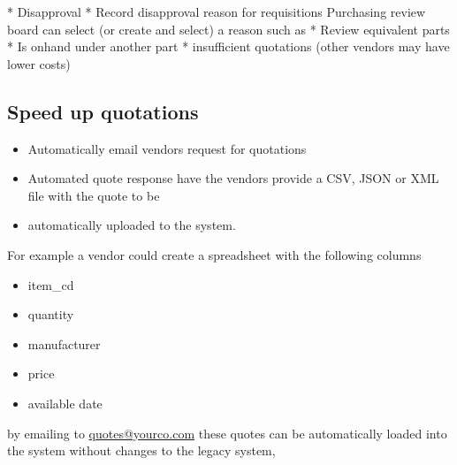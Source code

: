 \documentclass[letterpaper,10pt,english]{sphinxmanual}
\begin{document}
* Disapproval
\textbar{}  * Record disapproval reason for requisitions Purchasing review board
can select (or create and select) a reason such as
\textbar{}  * Review equivalent parts * Is onhand under another part *
insufficient quotations (other vendors may have lower costs)


\subsection{Speed up quotations}
\label{BusinessProcessReengineering:speed-up-quotations}\begin{itemize}
\item {} 
Automatically email vendors request for quotations

\item {} 
Automated quote response have the vendors provide a CSV, JSON or XML
file with the quote to be

\item {} 
automatically uploaded to the system.

\end{itemize}

For example a vendor could create a spreadsheet with the following
columns
\begin{itemize}
\item {} 
item\_cd

\item {} 
quantity

\item {} 
manufacturer

\item {} 
price

\item {} 
available date

\end{itemize}

by emailing to \href{mailto:quotes@yourco.com}{quotes@yourco.com} these quotes can be automatically
loaded into the system without changes to the legacy system,
\end{document}
